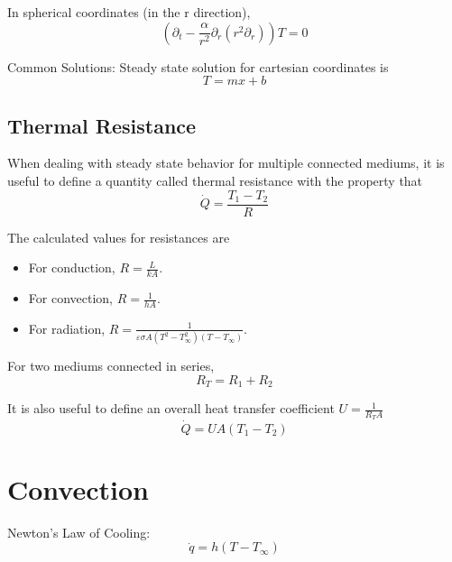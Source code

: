 \documentclass[a4paper]{article}
\numberwithin{equation}{section}
\begin{document}
	In spherical coordinates (in the r direction),
	\begin{equation}
		(\partial_t-\frac{\alpha}{r^2}\partial_r(r^2\partial_r)) T = 0
	\end{equation}
	
	Common Solutions:
	Steady state solution for cartesian coordinates is
	\begin{equation}
		T = mx+b
	\end{equation}

	\subsection{Thermal Resistance}

	When dealing with steady state behavior for multiple connected mediums, it is useful to define a quantity called thermal resistance with the property that 
	\begin{equation}
		\dot Q=\frac{T_1-T_2}{R}
	\end{equation}

	The calculated values for resistances are
	\begin{itemize}
		\item For conduction, $R=\frac{L}{kA}$.
		\item For convection, $R=\frac{1}{hA}$.
		\item For radiation, $R=\frac{1}{\varepsilon\sigma A(T^2-T_\infty^2)(T-T_\infty)}$.
	\end{itemize}

	For two mediums connected in series,
	\begin{equation}
		R_T=R_1+R_2
	\end{equation}

	It is also useful to define an overall heat transfer coefficient $U=\frac{1}{R_TA}$
	\begin{equation}
		\dot Q=UA(T_1-T_2)
	\end{equation}

   
	\section{Convection}
	Newton's Law of Cooling:
	\begin{equation}
		\dot q=h(T-T_\infty)
	\end{equation}

	
	
	
\end{document}

